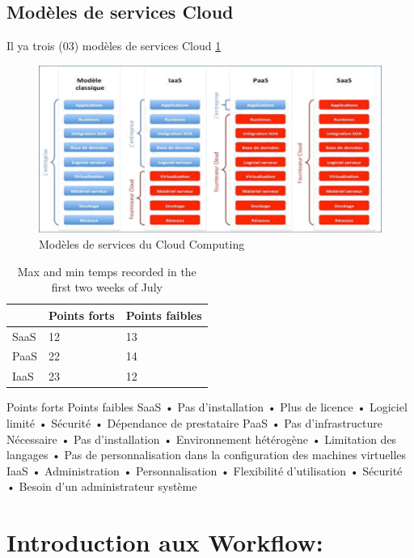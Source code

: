  
 \subsection{Modèles de services Cloud}
 Il ya trois (03) modèles de services Cloud  \ref{fig:screenshot003} 
 \begin{figure}[h]
 	\centering
 	\includegraphics[width=1\linewidth]{screenshot003}
 	\caption{Modèles de services du Cloud Computing}
 	\label{fig:screenshot003}
 \end{figure}
 
 \begin{table}[h]
 
 		\centering
 		\begin{tabular}{l | l | l}
 			 & Points forts & Points faibles \\
 			\hline
 			SaaS & 12 & 13\\
 			PaaS & 22 & 14\\
 			IaaS & 23 & 12
 	
 	\end{tabular} 

 	\caption{Max and min temps recorded in the first two weeks of July}
 	\label{tab:temps}
 \end{table}
 

 Points forts	Points faibles
 SaaS	•	Pas d’installation
 •	Plus de licence	•	Logiciel limité
 •	Sécurité
 •	Dépendance de prestataire
 PaaS	•	Pas d'infrastructure Nécessaire
 •	Pas d'installation
 •	Environnement hétérogène	•	Limitation des langages
 •	Pas de personnalisation dans la configuration des machines virtuelles
 IaaS	•	Administration
 •	Personnalisation
 •	Flexibilité d'utilisation	•	Sécurité
 •	Besoin d'un administrateur système
 
 
 \section{Introduction aux Workflow:}
 